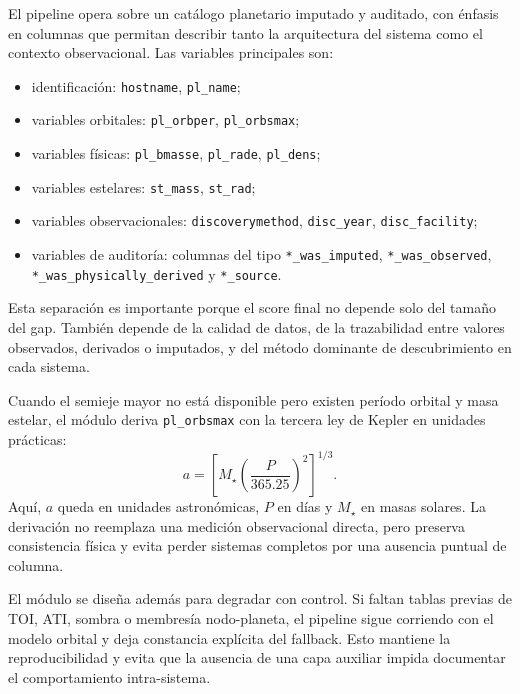 El pipeline opera sobre un cat\'alogo planetario imputado y auditado, con \'enfasis en columnas que permitan describir tanto la arquitectura del sistema como el contexto observacional. Las variables principales son:

\begin{itemize}
\item identificaci\'on: \texttt{hostname}, \texttt{pl\_name};
\item variables orbitales: \texttt{pl\_orbper}, \texttt{pl\_orbsmax};
\item variables f\'isicas: \texttt{pl\_bmasse}, \texttt{pl\_rade}, \texttt{pl\_dens};
\item variables estelares: \texttt{st\_mass}, \texttt{st\_rad};
\item variables observacionales: \texttt{discoverymethod}, \texttt{disc\_year}, \texttt{disc\_facility};
\item variables de auditor\'ia: columnas del tipo \texttt{*\_was\_imputed}, \texttt{*\_was\_observed}, \texttt{*\_was\_physically\_derived} y \texttt{*\_source}.
\end{itemize}

Esta separaci\'on es importante porque el score final no depende solo del tama\~no del gap. Tambi\'en depende de la calidad de datos, de la trazabilidad entre valores observados, derivados o imputados, y del m\'etodo dominante de descubrimiento en cada sistema.

Cuando el semieje mayor no est\'a disponible pero existen per\'iodo orbital y masa estelar, el m\'odulo deriva \texttt{pl\_orbsmax} con la tercera ley de Kepler en unidades pr\'acticas:
\[
a = \left[M_\star \left(\frac{P}{365.25}\right)^2\right]^{1/3}.
\]
Aqu\'i, $a$ queda en unidades astron\'omicas, $P$ en d\'ias y $M_\star$ en masas solares. La derivaci\'on no reemplaza una medici\'on observacional directa, pero preserva consistencia f\'isica y evita perder sistemas completos por una ausencia puntual de columna.

El m\'odulo se dise\~na adem\'as para degradar con control. Si faltan tablas previas de TOI, ATI, sombra o membres\'ia nodo-planeta, el pipeline sigue corriendo con el modelo orbital y deja constancia expl\'icita del fallback. Esto mantiene la reproducibilidad y evita que la ausencia de una capa auxiliar impida documentar el comportamiento intra-sistema.
